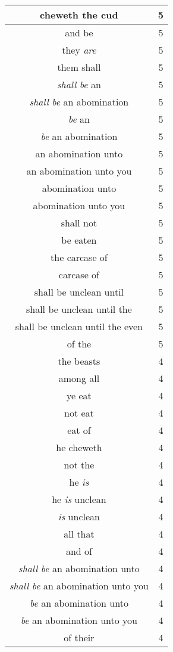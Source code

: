 \begin{center}
\begin{longtable}{|c|c|}
cheweth the cud & 5\\ \hline 
and be & 5\\ \hline 
they \emph{are} & 5\\ \hline 
them shall & 5\\ \hline 
\emph{shall} \emph{be} an & 5\\ \hline 
\emph{shall} \emph{be} an abomination & 5\\ \hline 
\emph{be} an & 5\\ \hline 
\emph{be} an abomination & 5\\ \hline 
an abomination unto & 5\\ \hline 
an abomination unto you & 5\\ \hline 
abomination unto & 5\\ \hline 
abomination unto you & 5\\ \hline 
shall not & 5\\ \hline 
be eaten & 5\\ \hline 
the carcase of & 5\\ \hline 
carcase of & 5\\ \hline 
shall be unclean until & 5\\ \hline 
shall be unclean until the & 5\\ \hline 
shall be unclean until the even & 5\\ \hline 
of the & 5\\ \hline 
the beasts & 4\\ \hline 
among all & 4\\ \hline 
ye eat & 4\\ \hline 
not eat & 4\\ \hline 
eat of & 4\\ \hline 
he cheweth & 4\\ \hline 
not the & 4\\ \hline 
he \emph{is} & 4\\ \hline 
he \emph{is} unclean & 4\\ \hline 
\emph{is} unclean & 4\\ \hline 
all that & 4\\ \hline 
and of & 4\\ \hline 
\emph{shall} \emph{be} an abomination unto & 4\\ \hline 
\emph{shall} \emph{be} an abomination unto you & 4\\ \hline 
\emph{be} an abomination unto & 4\\ \hline 
\emph{be} an abomination unto you & 4\\ \hline 
of their & 4\\ \hline 

\end{longtable}
\end{center}
